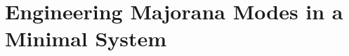 \documentclass[11pt, letterpaper, titlepage]{article}
\begin{document}

























\section{Engineering Majorana Modes in a Minimal System}
\end{document}
